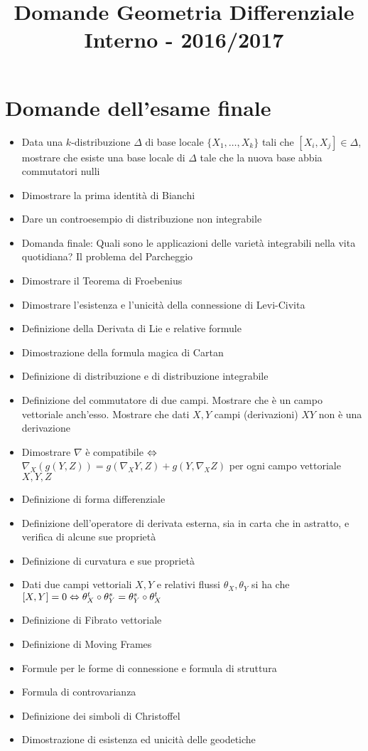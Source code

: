 \documentclass[a4paper,NoNotes,GeneralMath]{stdmdoc}
\begin{document}
\title{Domande Geometria Differenziale Interno - 2016/2017}

\section*{Domande dell'esame finale}
\begin{itemize}
\item Data una $k$-distribuzione $\Delta$ di base locale $\{X_1, \ldots, X_k\}$ tali che $[X_i, X_j] \in \Delta$, mostrare che esiste una base locale di $\Delta$ tale che la nuova base abbia commutatori nulli
\item Dimostrare la prima identità di Bianchi
\item Dare un controesempio di distribuzione non integrabile
\item Domanda finale: Quali sono le applicazioni delle varietà integrabili nella vita quotidiana? Il problema del Parcheggio
\item Dimostrare il Teorema di Froebenius
\item Dimostrare l'esistenza e l'unicità della connessione di Levi-Civita
\item Definizione della Derivata di Lie e relative formule
\item Dimostrazione della formula magica di Cartan
\item Definizione di distribuzione e di distribuzione integrabile
\item Definizione del commutatore di due campi. Mostrare che è un campo vettoriale anch'esso. Mostrare che dati $X, Y$ campi (derivazioni) $XY$ non è una derivazione
\item Dimostrare $\nabla$ è compatibile $\Leftrightarrow$ $\nabla_X (g(Y, Z)) = g(\nabla_X Y, Z) + g(Y, \nabla_X Z)$ per ogni campo vettoriale $X, Y, Z$
\item Definizione di forma differenziale
\item Definizione dell'operatore di derivata esterna, sia in carta che in astratto, e verifica di alcune sue proprietà
\item Definizione di curvatura e sue proprietà
\item Dati due campi vettoriali $X, Y$ e relativi flussi $\theta_X, \theta_Y$ si ha che $[X, Y] = 0 \Leftrightarrow \theta_X^{t} \circ \theta_Y^{s} = \theta_Y^{s} \circ \theta_X^{t}$
\item Definizione di Fibrato vettoriale
\item Definizione di Moving Frames
\item Formule per le forme di connessione e formula di struttura
\item Formula di controvarianza
\item Definizione dei simboli di Christoffel
\item Dimostrazione di esistenza ed unicità delle geodetiche
\end{itemize}
        
\end{document}
